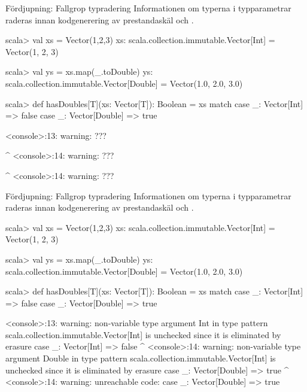 \ifkompendium\else
\begin{Slide}{Fördjupning: Fallgrop typradering }\SlideFontSmall
Informationen om typerna i typparametrar raderas innan kodgenerering av prestandaskäl och .
\vspace{-0.25em}\begin{REPL}
scala> val xs = Vector(1,2,3)
xs: scala.collection.immutable.Vector[Int] = Vector(1, 2, 3)

scala> val ys = xs.map(_.toDouble)
ys: scala.collection.immutable.Vector[Double] = Vector(1.0, 2.0, 3.0)

scala> def hasDoubles[T](xs: Vector[T]): Boolean = xs match {
         case _: Vector[Int] => false
         case _: Vector[Double] => true
       }

<console>:13: warning: ???


                        ^
<console>:14: warning: ???


                        ^
<console>:14: warning: ???
\end{REPL}
\end{Slide}
\fi

\begin{Slide}{Fördjupning: Fallgrop typradering }\SlideFontSmall
Informationen om typerna i typparametrar raderas innan kodgenerering av prestandaskäl och .
\vspace{-0.25em}\begin{REPL}
scala> val xs = Vector(1,2,3)
xs: scala.collection.immutable.Vector[Int] = Vector(1, 2, 3)

scala> val ys = xs.map(_.toDouble)
ys: scala.collection.immutable.Vector[Double] = Vector(1.0, 2.0, 3.0)

scala> def hasDoubles[T](xs: Vector[T]): Boolean = xs match {
         case _: Vector[Int] => false
         case _: Vector[Double] => true
       }

<console>:13: warning: non-variable type argument Int in type pattern scala.collection.immutable.Vector[Int]
is unchecked since it is eliminated by erasure
                case _: Vector[Int] => false
                        ^
<console>:14: warning: non-variable type argument Double in type pattern scala.collection.immutable.Vector[Int]
is unchecked since it is eliminated by erasure
                case _: Vector[Double] => true
                        ^
<console>:14: warning: unreachable code: case _: Vector[Double] => true
\end{REPL}
\end{Slide}

